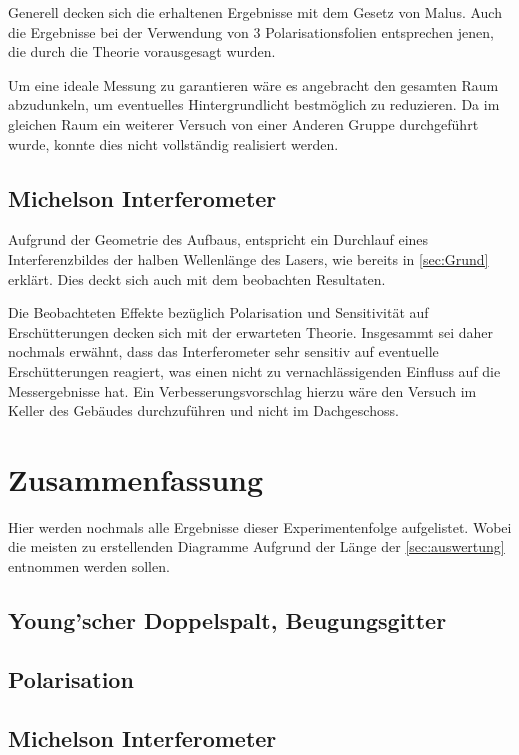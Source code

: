 \documentclass[12pt,english,ngerman]{scrartcl}
\begin{document}
Generell decken sich die erhaltenen Ergebnisse mit dem Gesetz von Malus. Auch die Ergebnisse bei der Verwendung von 3 
Polarisationsfolien entsprechen jenen, die durch die Theorie vorausgesagt wurden.

Um eine ideale Messung zu garantieren wäre es angebracht den gesamten Raum abzudunkeln, um eventuelles Hintergrundlicht 
bestmöglich zu reduzieren. Da im gleichen Raum ein weiterer Versuch von einer Anderen Gruppe durchgeführt wurde, konnte 
dies nicht vollständig realisiert werden.

\subsection{Michelson Interferometer}

Aufgrund der Geometrie des Aufbaus, entspricht ein Durchlauf eines Interferenzbildes der halben Wellenlänge des Lasers, 
wie bereits in \autoref{sec:Grund} erklärt. Dies deckt  sich auch mit dem beobachten Resultaten.

Die Beobachteten Effekte bezüglich Polarisation und Sensitivität auf Erschütterungen decken sich mit der erwarteten Theorie.
Insgesammt sei daher nochmals erwähnt, dass das Interferometer sehr sensitiv auf eventuelle Erschütterungen reagiert, was 
einen nicht zu vernachlässigenden Einfluss auf die Messergebnisse hat. Ein Verbesserungsvorschlag hierzu wäre den Versuch 
im Keller des Gebäudes durchzuführen und nicht im Dachgeschoss.

\section{Zusammenfassung}\label{sec:zusammenfassung}

Hier werden nochmals alle Ergebnisse dieser Experimentenfolge aufgelistet.
Wobei die meisten zu erstellenden Diagramme Aufgrund der Länge der
\autoref{sec:auswertung} entnommen werden sollen.

\subsection{Young'scher Doppelspalt, Beugungsgitter}


\subsection{Polarisation}


\subsection{Michelson Interferometer}


\newpage
\printbibliography
\listoffigures
\listoftables
\end{document}

